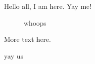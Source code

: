 \documentclass{isuthesistagged}
\author{Hello its me}
\begin{document}
Hello all, I am here. Yay me!
\begin{figure}
    \caption{whoops}
\end{figure}
More text here.
\begin{algorithm}[h]
    \caption{yay us}
\end{algorithm}
\end{document}
